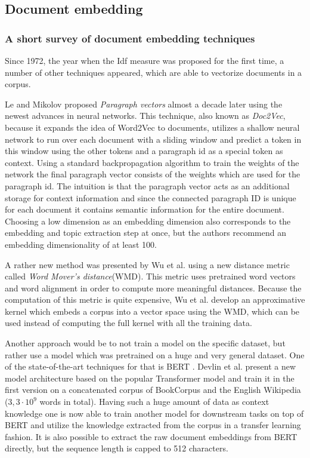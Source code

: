 \subsection{Document embedding}

\subsubsection{A short survey of document embedding techniques}
Since 1972, the year when the Idf measure was proposed for the first time, \cite{robertsonUnderstandingInverseDocument2004} a number of other techniques appeared, which are able to vectorize documents in a corpus.

Le and Mikolov \cite{leDistributedRepresentationsSentences2014} proposed \textit{Paragraph vectors} almost a decade later using the newest advances in neural networks. This technique, also known as \textit{Doc2Vec}, because it expands the idea of Word2Vec \cite{mikolovDistributedRepresentationsWords} to documents, utilizes a shallow neural network to run over each document with a sliding window and predict a token in this window using the other tokens and a paragraph id as a special token as context. Using a standard backpropagation algorithm to train the weights of the network the final paragraph vector consists of the weights which are used for the paragraph id. The intuition is that the paragraph vector acts as an additional storage for context information and since the connected paragraph ID is unique for each document it contains semantic information for the entire document. Choosing a low dimension as an embedding dimension also corresponds to the embedding and topic extraction step at once, but the authors recommend an embedding dimensionality of at least 100.

A rather new method was presented by Wu et al. \cite{wuWordMoverEmbedding2018} using a new distance metric called \textit{Word Mover's distance}(WMD). This metric uses pretrained word vectors and word alignment in order to compute more meaningful distances. Because the computation of this metric is quite expensive, Wu et al. develop an approximative kernel which embeds a corpus into a vector space using the WMD, which can be used instead of computing the full kernel with all the training data.

Another approach would be to not train a model on the specific dataset, but rather use a model which was pretrained on a huge and very general dataset. One of the state-of-the-art techniques for that is BERT \cite{devlinBERTPretrainingDeep2018}. Devlin et al. present a new model architecture based on the popular Transformer model \cite{vaswaniAttentionAllYou2017} and train it in the first version on a concatenated corpus of BookCorpus and the English Wikipedia ($3,3\cdot 10^9$ words in total).  Having such a huge amount of data as context knowledge one is now able to train another model for downstream tasks on top of BERT and utilize the knowledge extracted from the corpus in a transfer learning fashion. It is also possible to extract the raw document embeddings from BERT directly, but the sequence length is capped to 512 characters.


